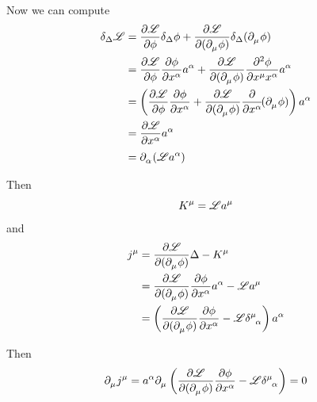 \documentclass{article}
\begin{document}
\noindent Now we can compute
\begin{align*}
    \delta_\Delta \mathscr{L} &= \dfrac{ \partial \mathscr{L} }{ \partial \phi } \delta_\Delta \phi + \dfrac{ \partial \mathscr{L} }{ \partial ( \tensor{\partial}{_\mu} \phi ) } \delta_\Delta ( \tensor{\partial}{_\mu} \phi ) \\
    &= \dfrac{ \partial \mathscr{L} }{ \partial \phi } \dfrac{ \partial \phi }{ \partial \tensor{x}{^\alpha} } \tensor{a}{^\alpha} + \dfrac{ \partial \mathscr{L} }{ \partial ( \tensor{\partial}{_\mu} \phi ) } \dfrac{ \partial^2 \phi }{ \partial \tensor{x}{^\mu} \tensor{x}{^\alpha} } \tensor{a}{^\alpha} \\
    &= \left( \dfrac{ \partial \mathscr{L} }{ \partial \phi } \dfrac{ \partial \phi }{ \partial \tensor{x}{^\alpha} } + \dfrac{ \partial \mathscr{L} }{ \partial ( \tensor{\partial}{_\mu} \phi ) } \dfrac{\partial}{ \partial \tensor{x}{^\alpha} } \! ( \tensor{\partial}{_\mu} \phi ) \right) \tensor{a}{^\alpha} \\
    &= \dfrac{ \partial \mathscr{L} }{ \partial \tensor{x}{^\alpha} } \tensor{a}{^\alpha} \\
    &= \tensor{\partial}{_\alpha} ( \mathscr{L} \tensor{a}{^\alpha} )
\end{align*}


\noindent Then
\begin{equation*}
    \tensor{K}{^\mu} = \mathscr{L} \tensor{a}{^\mu}
\end{equation*}
and
\begin{align*}
    \tensor{j}{^\mu} &= \dfrac{ \partial \mathscr{L} }{ \partial ( \tensor{\partial}{_\mu} \phi ) } \Delta - \tensor{K}{^\mu} \\
    &= \dfrac{ \partial \mathscr{L} }{ \partial ( \tensor{\partial}{_\mu} \phi ) } \dfrac{ \partial \phi }{ \partial \tensor{x}{^\alpha} } \tensor{a}{^\alpha} - \mathscr{L} \tensor{a}{^\mu} \\
    &= \left( \dfrac{ \partial \mathscr{L} }{ \partial ( \tensor{\partial}{_\mu} \phi ) } \dfrac{ \partial \phi }{ \partial \tensor{x}{^\alpha} } - \mathscr{L} \tensor{\delta}{^\mu_\alpha} \right) \tensor{a}{^\alpha}
\end{align*}

\noindent Then
\begin{equation*}
    \tensor{\partial}{_\mu} \tensor{j}{^\mu} = \tensor{a}{^\alpha} \tensor{\partial}{_\mu} \left( \dfrac{ \partial \mathscr{L} }{ \partial ( \tensor{\partial}{_\mu} \phi ) } \dfrac{ \partial \phi }{ \partial \tensor{x}{^\alpha} } - \mathscr{L} \tensor{\delta}{^\mu_\alpha} \right) = 0
\end{equation*}
\end{document}
